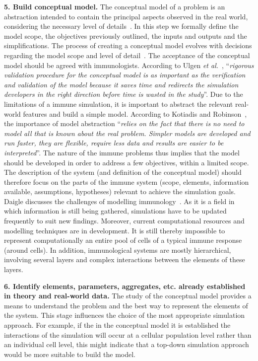 \documentclass{llncs}
\begin{document}
{\bf 5. Build conceptual model.} The conceptual model of a problem is an abstraction intended to contain the principal aspects observed in the real world, considering the necessary level of details~\cite{Robinson:2008}. In this step we formally define the model scope, the objectives previously outlined, the inputs and outputs and the simplifications. The process of creating a conceptual model evolves with decisions regarding the model scope and level of detail~\cite{Robinson:2004}. The acceptance of the conceptual model should be agreed with immunologists. According to Ulgen {\it et al.}~\cite{Ulgen:1994}, ``{\it rigorous validation procedure for the conceptual model is as important as the verification and validation of the model because it saves time and redirects the simulation developers in the right direction before time is wasted in the study}''. Due to the limitations of a immune simulation, it is important to abstract the relevant real-world features and build a simple model. According to Kotiadis and Robinson~\cite{Robinson:2008}, the importance of model abstraction ``{\it relies on the fact that there is no need to model all that is known about the real problem. Simpler models are developed and run faster, they are flexible, require less data and results are easier to be interpreted}''. The nature of the immune problems thus implies that the model should be developed in order to address a few objectives, within a limited scope. The description of the system (and definition of the conceptual model) should therefore focus on the parts of the immune system (scope, elements, information available, assumptions, hypotheses) relevant to achieve the simulation goals. Daigle discusses the challenges of modelling immunology~\cite{Daigle:2006}. As it is  a field in which information is still being gathered, simulations have to be updated frequently to suit new findings. Moreover, current computational resources and modelling techniques are in development.  It is still thereby impossible to  represent computationally an entire pool of cells of a typical immune response (around  cells). In addition, immunological systems are mostly hierarchical, involving several layers and complex interactions between the elements of these layers.

{\bf 6. Identify elements, parameters, aggregates, etc. already established in theory and real-world data.} The study of the conceptual model provides a means to understand the problem and the best way to represent the elements of the system. This stage influences the choice of the most appropriate simulation approach. For example, if the in the conceptual model it is established the interactions of the simulation will occur at a cellular population level rather than an individual cell level, this might indicate that a top-down simulation approach would be more suitable to build the model.
\end{document}
